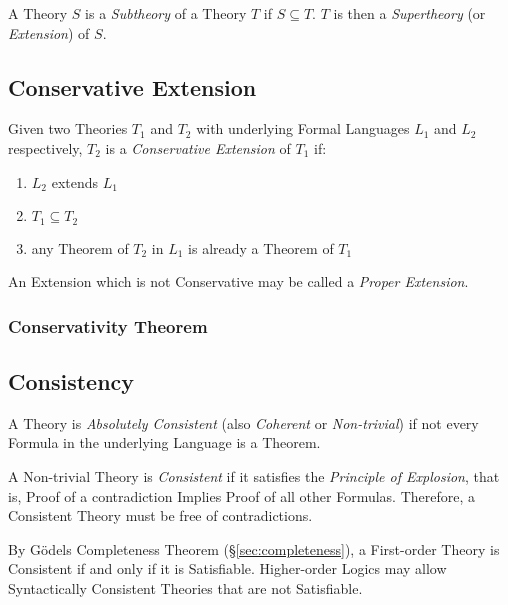 A Theory $S$ is a \emph{Subtheory} of a Theory $T$ if $S \subseteq T$.
$T$ is then a \emph{Supertheory} (or \emph{Extension}) of $S$.



\subsection{Conservative Extension}\label{sec:conservative_extension}

Given two Theories $T_1$ and $T_2$ with underlying Formal Languages
$L_1$ and $L_2$ respectively, $T_2$ is a \emph{Conservative Extension}
of $T_1$ if:
\begin{enumerate}
  \item $L_2$ extends $L_1$
  \item $T_1 \subseteq T_2$
  \item any Theorem of $T_2$ in $L_1$ is already a Theorem of $T_1$
\end{enumerate}
An Extension which is not Conservative may be called a \emph{Proper
  Extension}.



\subsubsection{Conservativity Theorem}\label{sec:conservativity_theorem}



\subsection{Consistency}\label{sec:consistency}

A Theory is \emph{Absolutely Consistent} (also \emph{Coherent} or
\emph{Non-trivial}) if not every Formula in the underlying Language is
a Theorem.

A Non-trivial Theory is \emph{Consistent} if it satisfies the
\emph{Principle of Explosion}, that is, Proof of a contradiction
Implies Proof of all other Formulas. Therefore, a Consistent Theory must
be free of contradictions.

By G\"odels Completeness Theorem (\S\ref{sec:completeness}), a
First-order Theory is Consistent if and only if it is Satisfiable.
Higher-order Logics may allow Syntactically Consistent Theories that
are not Satisfiable.

